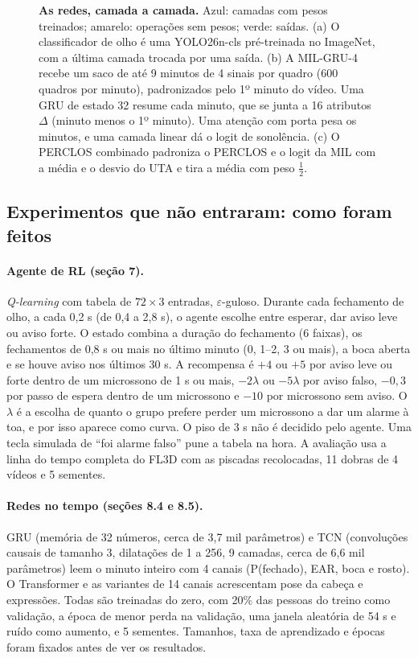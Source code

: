 \documentclass[11pt,a4paper]{article}
\newcommand{\fig}[1]{\resizebox{\textwidth}{!}{}}
\begin{document}
\begin{figure}[!t]
\centering
\fig{fig_redes.tex}
\caption{\textbf{As redes, camada a camada.} Azul: camadas com pesos treinados; amarelo: operações sem pesos; verde: saídas. (a) O classificador de olho é uma YOLO26n-cls pré-treinada no ImageNet, com a última camada trocada por uma saída. (b) A MIL-GRU-4 recebe um saco de até 9 minutos de 4 sinais por quadro (600 quadros por minuto), padronizados pelo 1º minuto do vídeo. Uma GRU de estado 32 resume cada minuto, que se junta a 16 atributos $\Delta$ (minuto menos o 1º minuto). Uma atenção com porta pesa os minutos, e uma camada linear dá o logit de sonolência. (c) O PERCLOS combinado padroniza o PERCLOS e o logit da MIL com a média e o desvio do UTA e tira a média com peso $\tfrac12$.}
\label{fig:redes}
\end{figure}

\subsection{Experimentos que não entraram: como foram feitos}
\label{sec:descartados}

\paragraph{Agente de RL (seção 7).} \emph{Q-learning} com tabela de $72 \times 3$ entradas, $\varepsilon$-guloso. Durante cada fechamento de olho, a cada 0,2 s (de 0,4 a 2,8 s), o agente escolhe entre esperar, dar aviso leve ou aviso forte. O estado combina a duração do fechamento (6 faixas), os fechamentos de 0,8 s ou mais no último minuto (0, 1--2, 3 ou mais), a boca aberta e se houve aviso nos últimos 30 s. A recompensa é $+4$ ou $+5$ por aviso leve ou forte dentro de um microssono de 1 s ou mais, $-2\lambda$ ou $-5\lambda$ por aviso falso, $-0{,}3$ por passo de espera dentro de um microssono e $-10$ por microssono sem aviso. O $\lambda$ é a escolha de quanto o grupo prefere perder um microssono a dar um alarme à toa, e por isso aparece como curva. O piso de 3 s não é decidido pelo agente. Uma tecla simulada de ``foi alarme falso'' pune a tabela na hora. A avaliação usa a linha do tempo completa do FL3D com as piscadas recolocadas, 11 dobras de 4 vídeos e 5 sementes.

\paragraph{Redes no tempo (seções 8.4 e 8.5).} GRU (memória de 32 números, cerca de 3,7 mil parâmetros) e TCN (convoluções causais de tamanho 3, dilatações de 1 a 256, 9 camadas, cerca de 6,6 mil parâmetros) leem o minuto inteiro com 4 canais (P(fechado), EAR, boca e rosto). O Transformer e as variantes de 14 canais acrescentam pose da cabeça e expressões. Todas são treinadas do zero, com 20\% das pessoas do treino como validação, a época de menor perda na validação, uma janela aleatória de 54 s e ruído como aumento, e 5 sementes. Tamanhos, taxa de aprendizado e épocas foram fixados antes de ver os resultados.
\end{document}
